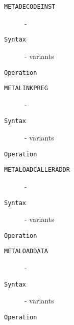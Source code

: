 \clearpage
\begin{description}
\item[\texttt{METADECODEINST}]  - \\
\item[\texttt{Syntax}] - variants\\

\item[\texttt{Operation}]
\item[\texttt{}]
\end{description}
\clearpage
\begin{description}
\item[\texttt{METALINKPREG}]  - \\
\item[\texttt{Syntax}] - variants\\

\item[\texttt{Operation}]
\item[\texttt{}]
\end{description}
\clearpage
\begin{description}
\item[\texttt{METALOADCALLERADDR}]  - \\
\item[\texttt{Syntax}] - variants\\

\item[\texttt{Operation}]
\item[\texttt{}]
\end{description}
\clearpage
\begin{description}
\item[\texttt{METALOADDATA}]  - \\
\item[\texttt{Syntax}] - variants\\

\item[\texttt{Operation}]
\item[\texttt{}]
\end{description}

